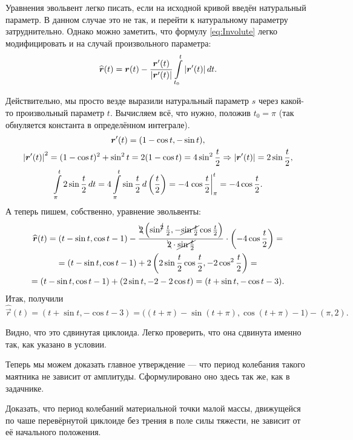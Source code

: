 \begin{solution}
	Уравнения эвольвент легко писать, если на исходной кривой введён натуральный параметр. В данном случае это не так, и перейти к натуральному параметру затруднительно. Однако можно заметить, что формулу \eqref{eq:Involute} легко модифицировать и на случай произвольного параметра:
	\[
		\widehat{\boldsymbol{r}}(t) = \boldsymbol{r}(t) - \frac{\boldsymbol{r}^\prime(t)}{\left\lvert\boldsymbol{r}^\prime(t)\right\rvert}\int\limits_{t_0}^t\left\lvert\boldsymbol{r}^\prime(t)\right\rvert dt.
	\]

	Действительно, мы просто везде выразили натуральный параметр $s$ через какой-то произвольный параметр $t$. Вычисляем всё, что нужно, положив $t_0 = \pi$ (так обнуляется константа в определённом интеграле).
	\begin{gather*}
		\boldsymbol{r}^\prime(t) = (1 - \cos t, -\sin t),\\
		\left\lvert\boldsymbol{r}^\prime(t)\right\rvert^2 = (1 - \cos t)^2 + \sin^2t = 2(1 - \cos t) = 4\sin^2\frac{t}{2} \Rightarrow \left\lvert\boldsymbol{r}^\prime(t)\right\rvert = 2\sin\frac{t}{2},\\
		\int\limits_\pi^t 2\sin\frac{t}{2}\,dt = 4\int\limits_\pi^t\sin\frac{t}{2}\,d\left(\frac{t}{2}\right) = -4\left.\cos\frac{t}{2}\right|_\pi^t = -4\cos\frac{t}{2}.
	\end{gather*}
	А теперь пишем, собственно, уравнение эвольвенты:
	\begin{multline*}
		\widehat{\boldsymbol{r}}(t) = (t - \sin t, \cos t - 1) - \frac{\bcancel{2}\left(\sin^{\cancel{2}}\frac{t}{2}, -\cancel{\sin\frac{t}{2}}\cos\frac{t}{2}\right)}{\bcancel{2} \cdot \cancel{\sin\frac{t}{2}}} \cdot \left(-4\cos\frac{t}{2}\right) =\\ = (t - \sin t, \cos t - 1) + 2\left(2\sin\frac{t}{2}\cos\frac{t}{2}, -2\cos^2\frac{t}{2}\right) =\\ = (t - \sin t, \cos t - 1) + (2\sin t, -2 - 2\cos t) = (t + \sin t, -\cos t - 3).
	\end{multline*}
	Итак, получили \[\widehat{\vec{r}}(t) = (t + \sin t, -\cos t - 3) = \big((t + \pi) - \sin(t + \pi), \cos(t + \pi) - 1\big) - (\pi, 2).\]

	Видно, что это сдвинутая циклоида. Легко проверить, что она сдвинута именно так, как указано в условии.
\end{solution}

Теперь мы можем доказать главное утверждение --- что период колебания такого маятника не зависит от амплитуды. Сформулировано оно здесь так же, как в задачнике.

\begin{problem}
	Доказать, что период колебаний материальной точки малой массы, движущейся по чаше перевёрнутой циклоиде без трения в поле силы тяжести, не зависит от её начального положения.
\end{problem}


